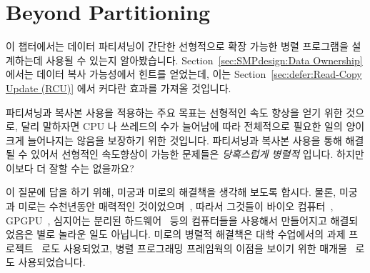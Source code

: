 
\section{Beyond Partitioning}
\label{sec:SMPdesign:Beyond Partitioning}

이 챕터에서는 데이터 파티셔닝이 간단한 선형적으로 확장 가능한 병렬 프로그램을
설계하는데 사용될 수 있는지 알아봤습니다.
Section~\ref{sec:SMPdesign:Data Ownership} 에서는 데이터 복사 가능성에서 힌트를
얻었는데, 이는 Section~\ref{sec:defer:Read-Copy Update (RCU)} 에서 커다란
효과를 가져올 것입니다.

파티셔닝과 복사본 사용을 적용하는 주요 목표는 선형적인 속도 향상을 얻기 위한
것으로, 달리 말하자면 CPU 나 쓰레드의 수가 늘어남에 따라 전체적으로 필요한 일의
양이 크게 늘어나지는 않음을 보장하기 위한 것입니다.
파티셔닝과 복사본 사용을 통해 해결될 수 있어서 선형적인 속도향상이 가능한
문제들은 \emph{당혹스럽게 병렬적} 입니다.
하지만 이보다 더 잘할 수는 없을까요?

이 질문에 답을 하기 위해, 미궁과 미로의 해결책을 생각해 보도록 합시다.
물론, 미궁과 미로는 수천년동안 매력적인 것이었으며~\cite{WikipediaLabyrinth},
따라서 그것들이 바이오 컴퓨터~\cite{AndrewAdamatzky2011SlimeMold},
GPGPU~\cite{ChristerEricson2008GPUMaze}, 심지어는 분리된
하드웨어~\cite{MIT:TRMag:MemristorMazes} 등의 컴퓨터들을 사용해서 만들어지고
해결되었음은 별로 놀라운 일도 아닙니다.
미로의 병렬적 해결책은 대학 수업에서의 과제
프로젝트~\cite{ETHZurich:FS2011maze,UMD:CMSC433maze} 로도 사용되었고, 병렬
프로그래밍 프레임웍의 이점을 보이기 위한 매개물~\cite{RonFosner2010maze} 로도
사용되었습니다.
\iffalse

